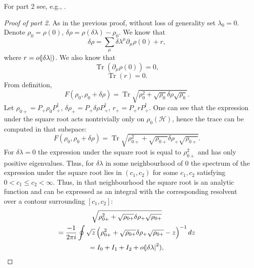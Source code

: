 \documentclass[american,aps,pra,reprint,floatfix,nofootinbib,superscriptaddress]{revtex4-2}
\DeclareMathOperator{\Tr}{Tr}
\begin{document}
For part 2 see, e.g., \cite[section 15.1]{bengtsson_zyczkowski_2017}.
\begin{proof}[Proof of part 2]
  As in the previous proof, without loss of generality set $\lambda_0 = 0$.
  Denote $\rho_0 = \rho(0)$, $\delta \rho = \rho(\delta \lambda) - \rho_0$.
  We know that
  \begin{equation}
    \delta \rho = \sum_{\mu} \delta\lambda^\mu \partial_\mu\rho(0) + r,
  \end{equation}
  where $r = o(\abs{\delta \lambda})$. We also know that
  \begin{equation}
    \Tr\left(\partial_\mu\rho(0)\right) = 0,
  \end{equation}
  \begin{equation}
    \Tr(r) = 0.
  \end{equation}
  From definition,
  \begin{equation}
    F(\rho_0, \rho_0 + \delta \rho) =
    \Tr \sqrt{\rho_0^2 + \sqrt{\rho_0} \delta \rho \sqrt{\rho_0}}.
  \end{equation}
  Let $\rho_{0{+}} = P_{{+}} \rho_0 P_{{+}}^{\dagger}$,
  $\delta\rho_{+} = P_{{+}} \delta\rho P_{{+}}^{\dagger}$,
  $r_{+} = P_{{+}} r P_{{+}}^{\dagger}$. One can see that the expression under the
  square root acts nontrivially only on $\rho_0(\mathcal{H})$, hence the trace
  can be computed in that subspace:
  \begin{equation}
    \label{eq:F.Tr.sqrt}
    F(\rho_0, \rho_0 + \delta \rho) = \Tr \sqrt{
      \rho_{0{+}}^2 + \sqrt{\rho_{0{+}}} \delta \rho_{+} \sqrt{\rho_{0{+}}}
    }.
  \end{equation}
  For $\delta \lambda = 0$ the expression under the square root is equal to
  $\rho_{0{+}}^2$ and has only positive eigenvalues. Thus, for $\delta \lambda$
  in some neighbourhood of $0$ the spectrum of the expression under the square
  root lies in $(c_1, c_2)$ for some $c_1,c_2$ satisfying
  $0 < c_1 \leq c_2 < \infty$. Thus, in that neighbourhood the square root is
  an analytic function and can be expressed as an integral with the
  corresponding resolvent over a contour surrounding $[c_1, c_2]$:
  \begin{multline}
    \label{eq:oint}
    \sqrt{
      \rho_{0{+}}^2 + \sqrt{\rho_{0{+}}} \delta \rho_{+} \sqrt{\rho_{0{+}}}
    } \\
    = \frac{-1}{2\pi i} \oint \sqrt{z} \left(
      \rho_{0{+}}^2 + \sqrt{\rho_{0{+}}} \delta \rho_{+} \sqrt{\rho_{0{+}}} - z
    \right)^{-1} dz \\
    = I_0 + I_1 + I_2 + o(\abs{\delta \lambda}^2),

\end{multline}
\end{proof}
\end{document}
